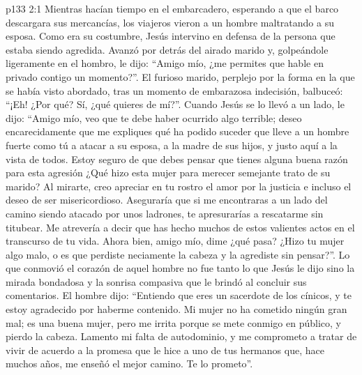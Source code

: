 \vs p133 2:1 Mientras hacían tiempo en el embarcadero, esperando a que el barco descargara sus mercancías, los viajeros vieron a un hombre maltratando a su esposa. Como era su costumbre, Jesús intervino en defensa de la persona que estaba siendo agredida. Avanzó por detrás del airado marido y, golpeándole ligeramente en el hombro, le dijo: “Amigo mío, ¿me permites que hable en privado contigo un momento?”. El furioso marido, perplejo por la forma en la que se había visto abordado, tras un momento de embarazosa indecisión, balbuceó: “¡Eh! ¿Por qué? Sí, ¿qué quieres de mí?”. Cuando Jesús se lo llevó a un lado, le dijo: “Amigo mío, veo que te debe haber ocurrido algo terrible; deseo encarecidamente que me expliques qué ha podido suceder que lleve a un hombre fuerte como tú a atacar a su esposa, a la madre de sus hijos, y justo aquí a la vista de todos. Estoy seguro de que debes pensar que tienes alguna buena razón para esta agresión ¿Qué hizo esta mujer para merecer semejante trato de su marido? Al mirarte, creo apreciar en tu rostro el amor por la justicia e incluso el deseo de ser misericordioso. Aseguraría que si me encontraras a un lado del camino siendo atacado por unos ladrones, te apresurarías a rescatarme sin titubear. Me atrevería a decir que has hecho muchos de estos valientes actos en el transcurso de tu vida. Ahora bien, amigo mío, dime ¿qué pasa? ¿Hizo tu mujer algo malo, o es que perdiste neciamente la cabeza y la agrediste sin pensar?”. Lo que conmovió el corazón de aquel hombre no fue tanto lo que Jesús le dijo sino la mirada bondadosa y la sonrisa compasiva que le brindó al concluir sus comentarios. El hombre dijo: “Entiendo que eres un sacerdote de los cínicos, y te estoy agradecido por haberme contenido. Mi mujer no ha cometido ningún gran mal; es una buena mujer, pero me irrita porque se mete conmigo en público, y pierdo la cabeza. Lamento mi falta de autodominio, y me comprometo a tratar de vivir de acuerdo a la promesa que le hice a uno de tus hermanos que, hace muchos años, me enseñó el mejor camino. Te lo prometo”.
